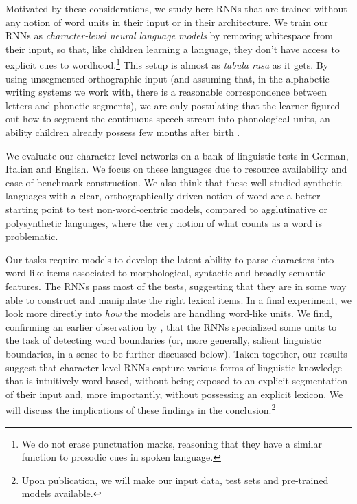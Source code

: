 Motivated by these considerations, we study here RNNs that are trained
without any notion of word units in their input or in their
architecture. We train our RNNs as \emph{character-level neural
  language models}
\cite[CNLMs,][]{Mikolov:etal:2011,Sutskever:etal:2011,DBLP:journals/corr/Graves13}
by removing whitespace from their input, so that, like children
learning a language, they don't have access to explicit cues to
wordhood.\footnote{We do not erase punctuation marks, reasoning that
  they have a similar function to prosodic cues in spoken language.}
This setup is almost as \emph{tabula rasa} as it gets. By using
unsegmented orthographic input (and assuming that, in the alphabetic
writing systems we work with, there is a reasonable correspondence
between letters and phonetic segments), we are only postulating that
the learner figured out how to segment the continuous speech stream
into phonological units, an ability children already possess few
months after birth \cite[e.g.,][]{Maye:etal:2002,Kuhl:2004}.

We evaluate our character-level networks on a bank of linguistic tests
in German, Italian and English. We focus on these languages due to
resource availability and ease of benchmark construction. We also
think that these well-studied synthetic languages with a clear,
orthographically-driven notion of word are a better starting point to
test non-word-centric models, compared to agglutinative or
polysynthetic languages, where the very notion of what counts as a
word is problematic. %
  
Our tasks require models to develop the latent
ability to parse characters into word-like items associated to
morphological, syntactic and broadly semantic features. The RNNs
pass most of the tests, suggesting that they are in some way able to
construct and manipulate the right lexical items. In a final experiment,
we look more directly into \emph{how} the models are handling
word-like units. We find, confirming an earlier observation by
, that the RNNs specialized some
units to the task of detecting word boundaries (or, more generally,
salient linguistic boundaries, in a sense to be further discussed
below). Taken together, our results suggest that character-level RNNs
capture various forms of linguistic knowledge that is intuitively
word-based, without being exposed to an explicit segmentation of their
 input and, more importantly, without possessing an explicit
lexicon. We will discuss the implications of these findings in the
conclusion.\footnote{Upon publication, we will make our input data,
  test sets and pre-trained models available.}

